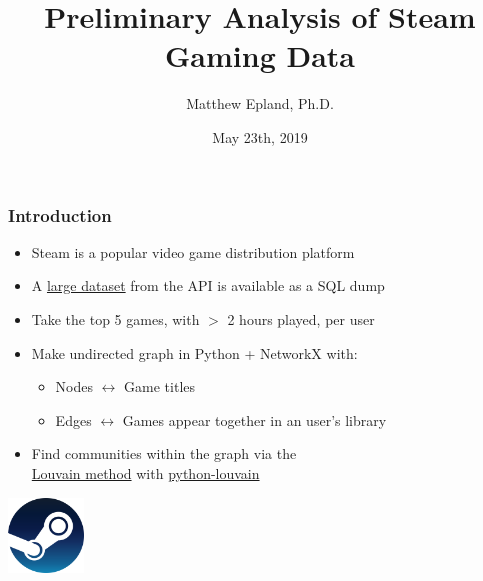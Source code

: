 \documentclass[18pt,xcolor=table]{beamer} \usefonttheme[onlymath]{serif}
\title[Preliminary Steam Analysis]{Preliminary Analysis of Steam Gaming Data}
\author[Epland]{Matthew Epland, Ph.D.}
\date{May 23th, 2019}
\begin{document}
\frame{\titlepage} 

\begin{frame}
  \frametitle{Introduction}
  \begin{itemize}
    \item Steam is a popular video game distribution platform
\vspace{0.2cm}
    \item A \href{http://steam.internet.byu.edu/}{large dataset} from the API is available as a SQL dump
\vspace{0.2cm}
    \item Take the top 5 games, with $>$ 2 hours played, per user
\vspace{0.2cm}
    \item Make undirected graph in Python + NetworkX with:
    \begin{itemize}
      \item Nodes $\leftrightarrow$ Game titles
      \vspace{0.1cm}
      \item Edges $\leftrightarrow$ Games appear together in an user's library
    \end{itemize}
\vspace{0.2cm}
    \item Find communities within the graph via the\\\href{http://stacks.iop.org/1742-5468/2008/i=10/a=P10008}{Louvain method} with \href{http://github.com/taynaud/python-louvain}{python-louvain}
  \end{itemize}
\vspace{0.23cm}
  \centering
  \includegraphics[width=0.15\textwidth]{steam_logo.png}
  \vspace{-0.3cm}
\end{frame}
\end{document}
